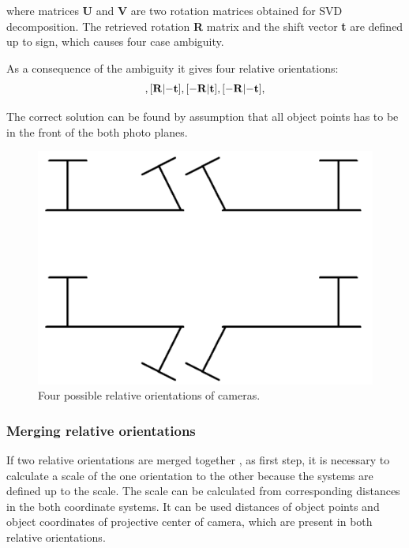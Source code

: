 \documentclass[a4paper,12pt]{article}
\newcommand{\ematr}[1]{
{\bf #1}
}
\newcommand{\evect}[1]{
{\bf #1}
}
\begin{document}
where matrices \ematr{U} and \ematr{V} are two rotation matrices  obtained for SVD decomposition.
The retrieved rotation \ematr{R} matrix and the shift vector \evect{t} are defined up to sign,
which causes four case ambiguity. 

As a consequence of the  ambiguity it gives four relative orientations: 
\begin{equation}
[\ematr{R}|\evect{t}],
[\ematr{R}|\evect{-t}],
[\ematr{-R}|\evect{t}],
[\ematr{-R}|\evect{-t}],
\end{equation}


The correct solution can be found   by assumption that all object points has to be in the front
of the both photo planes.

\begin{figure}[h]
    \centering
    \includegraphics[scale=0.3]{figures/eo_ambiguity.png}
    \caption{Four possible relative orientations of cameras.}
    \label{fig:rel_or_amb}
\end{figure}


\subsubsection{Merging relative orientations}
\label{sec:ess_chain}


If two relative orientations are merged together \cite{pietzsch2001robot}, as first step, it is necessary to calculate a scale of the one orientation
to the other because the systems are defined up to the scale.
The scale can be calculated from corresponding distances in the both coordinate systems. 
It can be used distances of 
object points and object coordinates of projective center of camera, which are present in both relative orientations.
\end{document}
